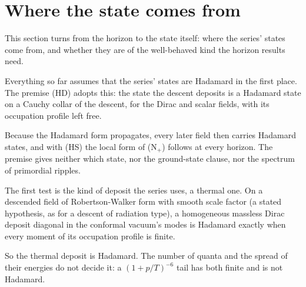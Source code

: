 \documentclass[11pt]{article}
\theoremstyle{definition}
\theoremstyle{plain}
\begin{document}
\section{Where the state comes from}

This section turns from the horizon to the state itself: where the series' states come from, and whether they are of the well-behaved kind the horizon results need.

Everything so far assumes that the series' states are Hadamard in the first place. The premise (HD) adopts this: the state the descent deposits is a Hadamard state on a Cauchy collar of the descent, for the Dirac and scalar fields, with its occupation profile left free.

Because the Hadamard form propagates, every later field then carries Hadamard states, and with (HS) the local form of (N$_{+}$) follows at every horizon. The premise gives neither which state, nor the ground-state clause, nor the spectrum of primordial ripples.

The first test is the kind of deposit the series uses, a thermal one. On a descended field of Robertson-Walker form with smooth scale factor (a stated hypothesis, as for a descent of radiation type), a homogeneous massless Dirac deposit diagonal in the conformal vacuum's modes is Hadamard exactly when every moment of its occupation profile is finite.

So the thermal deposit is Hadamard. The number of quanta and the spread of their energies do not decide it: a $(1 + p/T)^{-6}$ tail has both finite and is not Hadamard.
\end{document}
